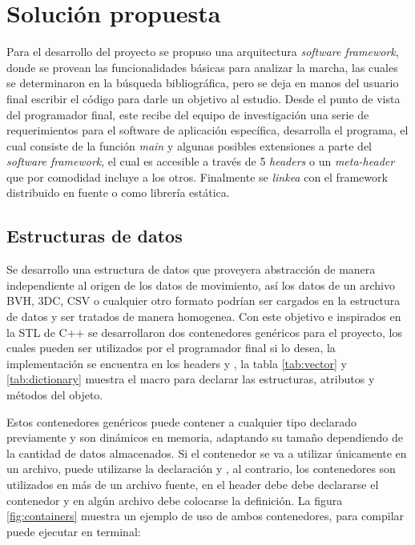 \chapter{Solución propuesta}\label{chap:solucion}

Para el desarrollo del proyecto se propuso una arquitectura \emph{software framework}, donde se provean las funcionalidades básicas para analizar la marcha, las cuales se determinaron en la búsqueda bibliográfica, pero se deja en manos del usuario final escribir el código para darle un objetivo al estudio. Desde el punto de vista del programador final, este recibe del equipo de investigación una serie de requerimientos para el software de aplicación específica, desarrolla el programa, el cual consiste de la función \emph{main} y algunas posibles extensiones a parte del \emph{software framework}, el cual es accesible a través de 5 \emph{headers} o un \emph{meta-header} que por comodidad incluye a los otros. Finalmente se \emph{linkea} con el framework distribuido en fuente o como librería estática. 

\section{Estructuras de datos}

Se desarrollo una estructura de datos que proveyera abstracción de manera independiente al origen de los datos de movimiento, así los datos de un archivo BVH, 3DC, CSV o cualquier otro formato podrían ser cargados en la estructura de datos y ser tratados de manera homogenea. Con este objetivo e inspirados en la STL de C++ se desarrollaron dos contenedores genéricos para el proyecto, los cuales pueden ser utilizados por el programador final si lo desea, la implementación se encuentra en los headers  y , la tabla \ref{tab:vector} y \ref{tab:dictionary} muestra el macro para declarar las estructuras, atributos y métodos del objeto. 

Estos contenedores genéricos puede contener a cualquier tipo declarado previamente y son dinámicos en memoria, adaptando su tamaño dependiendo de la cantidad de datos almacenados. Si el contenedor se va a utilizar únicamente en un archivo, puede utilizarse la declaración  y , al contrario, los contenedores son utilizados en más de un archivo fuente, en el header debe debe declararse el contenedor y en algún archivo debe colocarse la definición. La figura \ref{fig:containers} muestra un ejemplo de uso de ambos contenedores, para compilar puede ejecutar en terminal:

